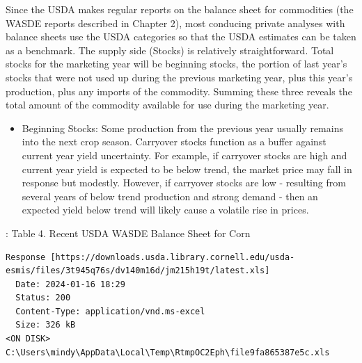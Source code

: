 \documentclass[
  letterpaper,
  DIV=11,
  numbers=noendperiod]{scrreprt}
\providecommand{\tightlist}{%
  \setlength{\itemsep}{0pt}\setlength{\parskip}{0pt}}\usepackage{longtable,booktabs,array}
\begin{document}
Since the USDA makes regular reports on the balance sheet for
commodities (the WASDE reports described in Chapter 2), most conducing
private analyses with balance sheets use the USDA categories so that the
USDA estimates can be taken as a benchmark. The supply side (Stocks) is
relatively straightforward. Total stocks for the marketing year will be
beginning stocks, the portion of last year's stocks that were not used
up during the previous marketing year, plus this year's production, plus
any imports of the commodity. Summing these three reveals the total
amount of the commodity available for use during the marketing year.

\begin{itemize}
\tightlist
\item
  Beginning Stocks: Some production from the previous year usually
  remains into the next crop season. Carryover stocks function as a
  buffer against current year yield uncertainty. For example, if
  carryover stocks are high and current year yield is expected to be
  below trend, the market price may fall in response but modestly.
  However, if carryover stocks are low - resulting from several years of
  below trend production and strong demand - then an expected yield
  below trend will likely cause a volatile rise in prices.
\end{itemize}

: Table 4. Recent USDA WASDE Balance Sheet for Corn

\begin{verbatim}
Response [https://downloads.usda.library.cornell.edu/usda-esmis/files/3t945q76s/dv140m16d/jm215h19t/latest.xls]
  Date: 2024-01-16 18:29
  Status: 200
  Content-Type: application/vnd.ms-excel
  Size: 326 kB
<ON DISK>  C:\Users\mindy\AppData\Local\Temp\RtmpOC2Eph\file9fa865387e5c.xls
\end{verbatim}
\end{document}

